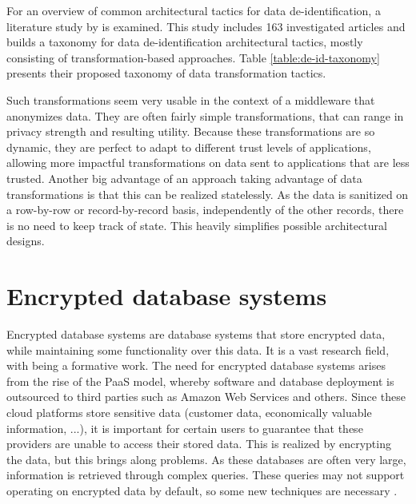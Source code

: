 For an overview of common architectural tactics for data de-identification, a literature study by \citeauthor{de-id-taxonomy} is examined. This study includes 163 investigated articles and builds a taxonomy for data de-identification architectural tactics, mostly consisting of transformation-based approaches. Table \ref{table:de-id-taxonomy} presents their proposed taxonomy of data transformation tactics.

Such transformations seem very usable in the context of a middleware that anonymizes data. They are often fairly simple transformations, that can range in privacy strength and resulting utility. Because these transformations are so dynamic, they are perfect to adapt to different trust levels of applications, allowing more impactful transformations on data sent to applications that are less trusted. Another big advantage of an approach taking advantage of data transformations is that this can be realized statelessly. As the data is sanitized on a row-by-row or record-by-record basis, independently of the other records, there is no need to keep track of state. This heavily simplifies possible architectural designs.
\newpage


\section{Encrypted database systems}
\label{sec:enc-db}
\noindent Encrypted database systems are database systems that store encrypted data, while maintaining some functionality over this data. It is a vast research field, with \citet{sok-cryptdb} being a formative work. The need for encrypted database systems arises from the rise of the PaaS model, whereby software and database deployment is outsourced to third parties such as Amazon Web Services and others. Since these cloud platforms store sensitive data (customer data, economically valuable information, ...), it is important for certain users to guarantee that these providers are unable to access their stored data. This is realized by encrypting the data, but this brings along problems. As these databases are often very large, information is retrieved through complex queries. These queries may not support operating on encrypted data by default, so some new techniques are necessary \citep{datablinder}. 

